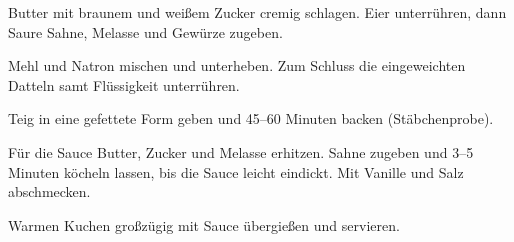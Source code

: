 \begin{recipe}
{    \step%
    Butter mit braunem und weißem Zucker cremig schlagen. Eier unterrühren, dann Saure Sahne, Melasse und Gewürze zugeben.
    
    \step%
    Mehl und Natron mischen und unterheben. Zum Schluss die eingeweichten Datteln samt Flüssigkeit unterrühren.
    
    \step%
    Teig in eine gefettete Form geben und 45--60 Minuten backen (Stäbchenprobe).
    
    \step%
    Für die Sauce Butter, Zucker und Melasse erhitzen. Sahne zugeben und 3--5 Minuten köcheln lassen, bis die Sauce leicht eindickt. Mit Vanille und Salz abschmecken.
    
    \step%
    Warmen Kuchen großzügig mit Sauce übergießen und servieren.
}


\end{recipe}
